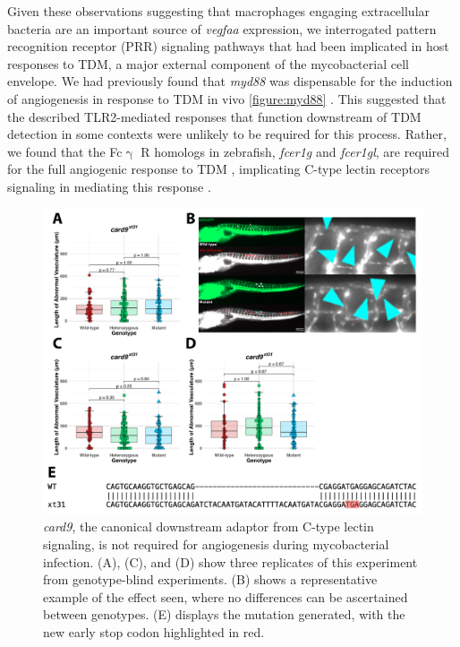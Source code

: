 Given these observations suggesting that macrophages engaging extracellular bacteria are an important source of \textit{vegfaa} expression, we interrogated pattern recognition receptor (PRR) signaling pathways that had been implicated in host responses to TDM, a major external component of the mycobacterial cell envelope. We had previously found that \textit{myd88} was dispensable for the induction of angiogenesis in response to TDM in vivo \autoref{figure:myd88} \citep{Bowdish2009, Walton2018}. This suggested that the described TLR2-mediated responses that function downstream of TDM detection in some contexts were unlikely to be required for this process. Rather, we found that the Fc$\upgamma$ R homologs in zebrafish, \textit{fcer1g} and \textit{fcer1gl}, are required for the full angiogenic response to TDM \citep{Walton2018}, implicating C-type lectin receptors signaling in mediating this response \citep{Richardson2014, Zhao2014}.

\begin{figure}
\centering
\includegraphics[width=\textwidth]{images/card9.pdf}
\caption{\textit{card9}, the canonical downstream adaptor from C-type lectin signaling, is not required for angiogenesis during mycobacterial infection. (A), (C), and (D) show three replicates of this experiment from genotype-blind experiments. (B) shows a representative example of the effect seen, where no differences can be ascertained between genotypes. (E) displays the mutation generated, with the new early stop codon highlighted in red.}
\label{figure:card9}
\end{figure}

